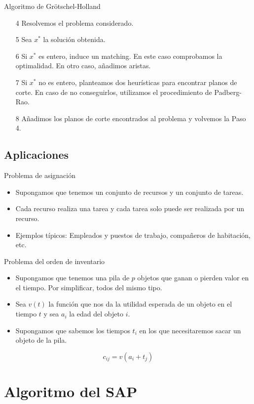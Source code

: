\documentclass{beamer}
\begin{document}
\begin{frame}{Algoritmo de Grötschel-Holland}
\begin{enumerate}
\item[4] Resolvemos el problema considerado. 
\item [5] Sea $x^*$ la solución obtenida.
\item[6] Si $x^*$ es entero, induce un matching. En este caso comprobamos la optimalidad. En otro caso, añadimos aristas.
\item[7] Si $x^*$ no es entero, planteamos dos heurísticas para encontrar planos de corte. En caso de no conseguirlos, utilizamos el procedimiento de Padberg-Rao.
\item[8] Añadimos los planos de corte encontrados al problema y volvemos la Paso 4.
\end{enumerate}
\end{frame}
\subsection{Aplicaciones}
\begin{frame}{Problema de asignación}
\begin{itemize}
\item Supongamos que tenemos un conjunto de recursos y un conjunto de tareas.
\item Cada recurso realiza una tarea y cada tarea solo puede ser realizada por un recurso.
\item Ejemplos típicos: Empleados y puestos de trabajo, compañeros de habitación, etc.
\end{itemize}
\end{frame}

\begin{frame}{Problema del orden de inventario}
\begin{itemize}
\item Supongamos que tenemos una pila de $p$ objetos que ganan o pierden valor en el tiempo. Por simplificar, todos del mismo tipo.  
\item Sea $v(t)$ la función que nos da la utilidad esperada de un objeto en el tiempo $t$  y sea $a_i$ la edad del objeto $i$.
\item Supongamos que sabemos los tiempos $t_i$ en los que necesitaremos sacar un objeto de la pila. 
\end{itemize}
$$
c_{ij} = v(a_i+t_j)
$$
\end{frame}
\section{Algoritmo del SAP}
\end{document}
